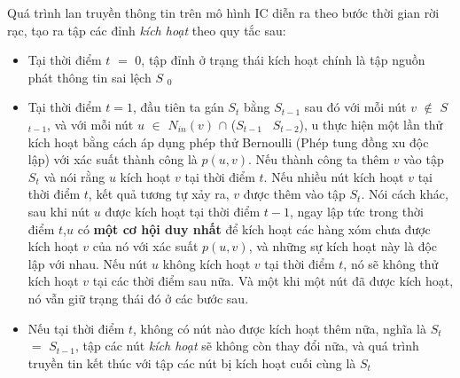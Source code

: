 	Quá trình lan truyền thông tin trên mô hình IC diễn ra theo bước thời gian rời rạc, tạo ra tập các đỉnh {\itshape kích hoạt} theo quy tắc sau:
	\begin {itemize}
		\item Tại thời điểm $t$ $=$ $0$, tập đỉnh ở trạng thái kích hoạt chính là tập nguồn phát thông tin sai lệch $S$ $_{0}$
	
		\item Tại thời điểm $t = 1$, đầu tiên ta gán $S$$_{t}$ bằng $S$$_{t-1}$ sau đó với mỗi nút $v$ $\notin$ $S$ $_{t-1}$, và với mỗi nút $u$ $\in$ $N$$_{in}$$(v)$ $\cap$ ($S$$_{t-1}$ \ $S$$_{t-2}$), u thực hiện một lần thử kích hoạt bằng cách áp dụng phép thử Bernoulli (Phép tung đồng xu độc lập) với xác suất thành công là $p(u,v)$. Nếu thành công ta thêm $v$ vào tập $S$$_{t}$ và nói rằng $u$ kích hoạt $v$ tại thời điểm $t$. Nếu nhiều nút kích hoạt $v$ tại thời điểm $t$, kết quả tương tự xảy ra, $v$ được thêm vào tập $S$$_{t}$. Nói cách khác, sau khi nút $u$ được kích hoạt tại thời điểm $t-1$, ngay lập tức trong thời điểm $t$,$ u$ có {\bfseries một cơ hội duy nhất} để kích hoạt các hàng xóm chưa được kích hoạt $v$ của nó với xác suất $p(u,v)$, và những sự kích hoạt này là độc lập với nhau. Nếu nút $u$ không kích hoạt $v$ tại thời điểm $t$, nó sẽ không thử kích hoạt $v$ tại các thời điểm sau nữa. Và một khi một nút đã được kích hoạt, nó vẫn giữ trạng thái đó ở các bước sau.
		
		\item Nếu tại thời điểm $t$, không có nút nào được kích hoạt thêm nữa, nghĩa là $S$$_{t}$ $=$ $S$$_{t-1}$, tập các nút {\itshape kích hoạt} sẽ không còn thay đổi nữa, và quá trình truyền tin kết thúc với tập các nút bị kích hoạt cuối cùng là $S$$_{t}$
	\end {itemize}
	

